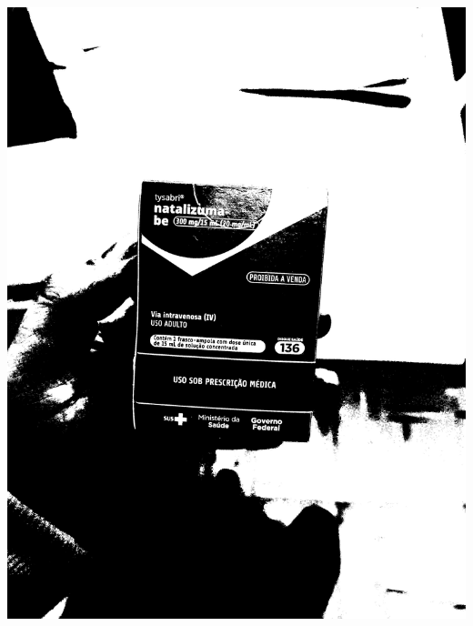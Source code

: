 \begin{frame}
\begin{columns}
\begin{column}{0.24\textwidth}
			\includegraphics[height=0.35\textheight]{../pictures/tysabri_rgb_g_only_thresh.jpg}
			\\\vspace{\floatsep}

\end{column}
\end{columns}
\end{frame}
